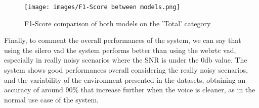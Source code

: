 \documentclass[../main.tex]{subfiles}
\begin{document}
\begin{figure}[ht]
    \centering
    \texttt{[image: images/F1-Score between models.png]}
    \caption{F1-Score comparison of both models on the 'Total' category}
    \label{fig:f1-score both models}
\end{figure}

\clearpage

Finally, to comment the overall performances of the system, we can say that using the silero vad the system performs better than using the webrtc vad, especially in really noisy scenarios where the SNR is under the 0db value. The system shows good performances overall considering the really noisy scenarios, and the variability of the environment presented in the datasets, obtaining an accuracy of around 90\% that increase further when the voice is cleaner, as in the normal use case of the system.
\end{document}
